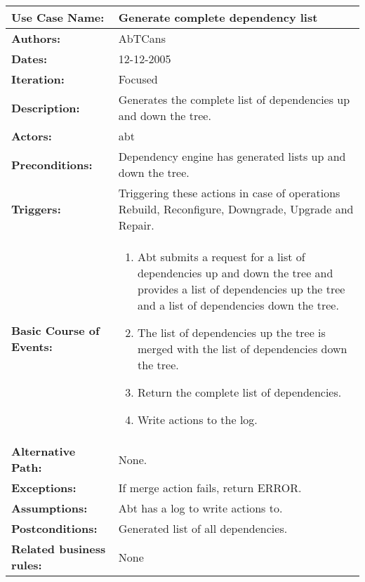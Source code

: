 \begin{tabularx}{\linewidth}{|l|X|}
\hline
\textbf{Use Case Name:} & \textbf{Generate complete dependency list} \\
\hline
\textbf{Authors:} & AbTCans\\
\hline
\textbf{Dates:} & 12-12-2005\\
\hline
\textbf{Iteration:} & Focused\\
\hline
\textbf{Description:} & Generates the complete list of dependencies up and down the tree.\\
\hline
\textbf{Actors:} & abt\\ 
\hline
\textbf{Preconditions:} & Dependency engine has generated lists up and down the tree.\\
\hline
\textbf{Triggers:} & Triggering these actions in case of operations Rebuild, Reconfigure, Downgrade, Upgrade and Repair.\\
\hline
\textbf{Basic Course of Events:} & 
\begin{minipage}{\linewidth} 
  \vspace{0.05em}
  \begin{enumerate}
   \item Abt submits a request for a list of dependencies up and down the tree and provides a list of dependencies up the tree and a list of dependencies down the tree.
   \item The list of dependencies up the tree is merged with the list of dependencies down the tree.
   \item Return the complete list of dependencies.
   \item Write actions to the log.
  \end{enumerate}
  \vspace{0.05em}
\end{minipage}
\\
\hline 
\textbf{Alternative Path:} & None.\\
\hline
\textbf{Exceptions:} & If merge action fails, return ERROR. \\
\hline
\textbf{Assumptions:} & Abt has a log to write actions to. \\
\hline
\textbf{Postconditions:} & Generated list of all dependencies.\\
\hline
\textbf{Related business rules:} & None\\
\hline
\end{tabularx}


   